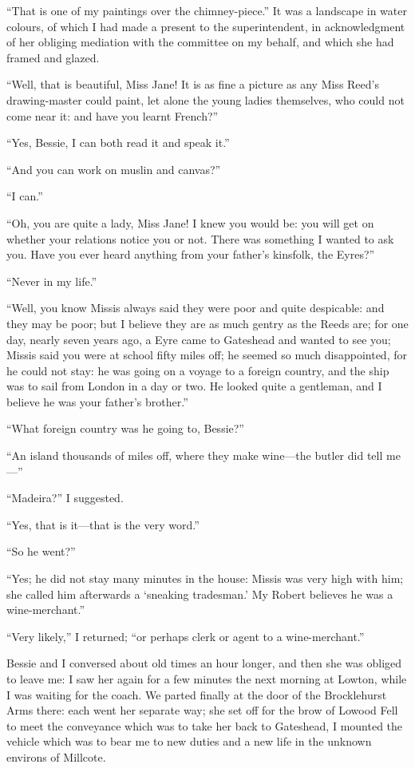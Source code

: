 \enquote{That is one of my paintings over the chimney-piece.} It was a
landscape in water colours, of which I had made a present to the
superintendent, in acknowledgment of her obliging mediation with the
committee on my behalf, and which she had framed and glazed.

\enquote{Well, that is beautiful, Miss Jane! It is as fine a picture as
any Miss Reed's drawing-master could paint, let alone the young ladies
themselves, who could not come near it: and have you learnt French?}

\enquote{Yes, Bessie, I can both read it and speak it.}

\enquote{And you can work on muslin and canvas?}

\enquote{I can.}

\enquote{Oh, you are quite a lady, Miss Jane! I knew you would be: you
will get on whether your relations notice you or not. There was
something I wanted to ask you. Have you ever heard anything from your
father's kinsfolk, the Eyres?}

\enquote{Never in my life.}

\enquote{Well, you know Missis always said they were poor and quite
despicable: and they may be poor; but I believe they are as much gentry
as the Reeds are; for one day, nearly seven years ago, a \Mr{} Eyre came
to Gateshead and wanted to see you; Missis said you were at school fifty
miles off; he seemed so much disappointed, for he could not stay: he was
going on a voyage to a foreign country, and the ship was to sail from
London in a day or two. He looked quite a gentleman, and I believe he
was your father's brother.}

\enquote{What foreign country was he going to, Bessie?}

\enquote{An island thousands of miles off, where they make wine---the
butler did tell me---}

\enquote{Madeira?} I suggested.

\enquote{Yes, that is it---that is the very word.}

\enquote{So he went?}

\enquote{Yes; he did not stay many minutes in the house: Missis was very
high with him; she called him afterwards a \enquote{sneaking
tradesman.} My Robert believes he was a wine-merchant.}

\enquote{Very likely,} I returned; \enquote{or perhaps clerk or agent to
a wine-merchant.}

Bessie and I conversed about old times an hour longer, and then she was
obliged to leave me: I saw her again for a few minutes the next morning
at Lowton, while I was waiting for the coach. We parted finally at the
door of the Brocklehurst Arms there: each went her separate way; she set
off for the brow of Lowood Fell to meet the conveyance which was to take
her back to Gateshead, I mounted the vehicle which was to bear me to new
duties and a new life in the unknown environs of Millcote.
